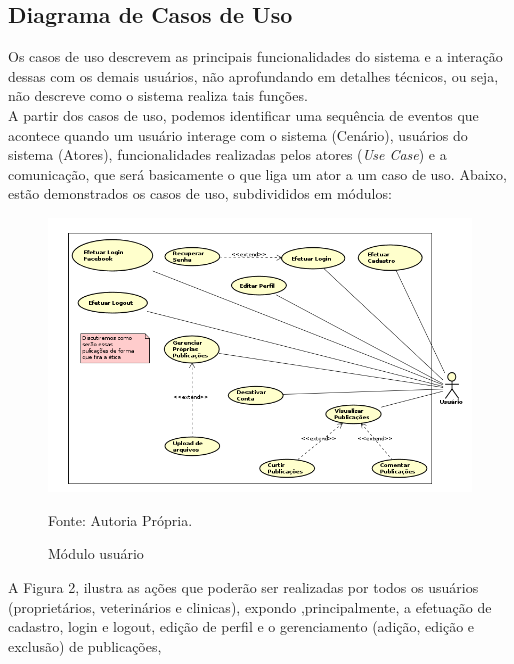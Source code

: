 \subsection{Diagrama de Casos de Uso}
Os casos de uso descrevem as principais funcionalidades do sistema e a interação dessas com os demais usuários, não aprofundando em detalhes técnicos, ou seja, não descreve como o sistema realiza tais funções.
\\
\indent
A partir dos casos de uso, podemos identificar uma sequência de eventos que acontece quando um usuário interage com o sistema (Cenário), usuários do sistema (Atores), funcionalidades realizadas pelos atores ({\it Use Case}) e a comunicação, que será basicamente o que liga um ator a um caso de uso. Abaixo, estão demonstrados os casos de uso, subdivididos em módulos:


\begin{figure}[h!]
	\centering	\includegraphics[scale=0.50
	]{imagens/usercasodeuso}
	\caption{Módulo usuário}
	Fonte: Autoria Própria.
	\label{Rotulo}
\end{figure}

\newpage
A Figura 2, ilustra as ações que poderão ser realizadas por todos os usuários (proprietários, veterinários e clinicas), expondo ,principalmente, a efetuação de cadastro, login e logout, edição de perfil e o gerenciamento (adição, edição e exclusão) de publicações, 


